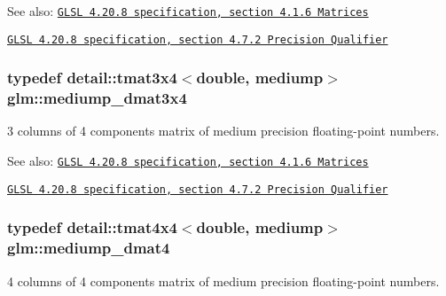 \begin{Desc}
\item[See also:]\href{http://www.opengl.org/registry/doc/GLSLangSpec.4.20.8.pdf}{\tt GLSL 4.20.8 specification, section 4.1.6 Matrices} 

\href{http://www.opengl.org/registry/doc/GLSLangSpec.4.20.8.pdf}{\tt GLSL 4.20.8 specification, section 4.7.2 Precision Qualifier} \end{Desc}
\hypertarget{group__core__precision_gedd814e706701200b13b86fc6fd7b373}{
\subsubsection[mediump\_\-dmat3x4]{\setlength{\rightskip}{0pt plus 5cm}typedef detail::tmat3x4$<$double, mediump$>$ {\bf glm::mediump\_\-dmat3x4}}}
\label{group__core__precision_gedd814e706701200b13b86fc6fd7b373}


3 columns of 4 components matrix of medium precision floating-point numbers.

\begin{Desc}
\item[See also:]\href{http://www.opengl.org/registry/doc/GLSLangSpec.4.20.8.pdf}{\tt GLSL 4.20.8 specification, section 4.1.6 Matrices} 

\href{http://www.opengl.org/registry/doc/GLSLangSpec.4.20.8.pdf}{\tt GLSL 4.20.8 specification, section 4.7.2 Precision Qualifier} \end{Desc}
\hypertarget{group__core__precision_g73de517f040f7d50746bbe273a396685}{
\subsubsection[mediump\_\-dmat4]{\setlength{\rightskip}{0pt plus 5cm}typedef detail::tmat4x4$<$double, mediump$>$ {\bf glm::mediump\_\-dmat4}}}
\label{group__core__precision_g73de517f040f7d50746bbe273a396685}


4 columns of 4 components matrix of medium precision floating-point numbers.

